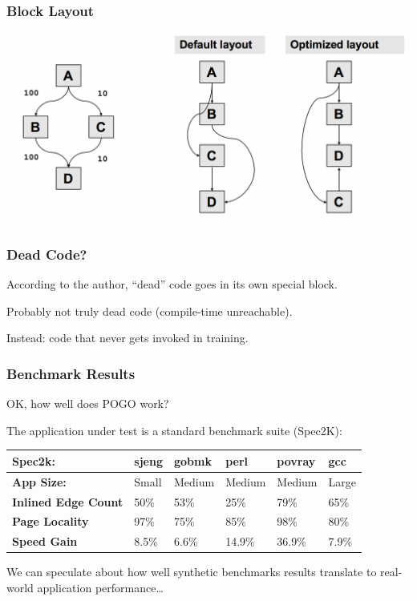 \begin{frame}
\frametitle{Block Layout}

\begin{center}
	\includegraphics[width=\textwidth]{images/blocklayout.png}
\end{center}

\end{frame}



\begin{frame}
\frametitle{Dead Code?}



According to the author, ``dead'' code goes in its own special block. 

Probably not truly dead code (compile-time unreachable).

Instead: code that never gets invoked in training.


\end{frame}



\begin{frame}
\frametitle{Benchmark Results}
 
OK, how well does POGO work?

The application under test is a standard benchmark suite (Spec2K):


\begin{center}
\begin{tabular}{l|l|l|l|l|l}
	\textbf{Spec2k:} & \textbf{sjeng} & \textbf{gobmk} & \textbf{perl} & \textbf{povray} & \textbf{gcc}\\ \hline
	\textbf{App Size:} &  {Small} & {Medium} & {Medium} & {Medium} & {Large} \\ \hline
	\textbf{Inlined Edge Count} & 50\% & 53\% & 25\% & 79\% & 65\% \\ \hline
	\textbf{Page Locality} & 97\% & 75\% & 85\% & 98\% & 80\% \\ \hline
	\textbf{Speed Gain} & 8.5\% & 6.6\% & 14.9\% & 36.9\% & 7.9\% \\ 
\end{tabular}
\end{center}

 
We can speculate about how well synthetic benchmarks results translate to real-world application performance\ldots


\end{frame}






